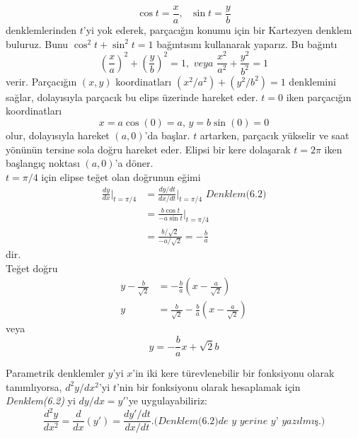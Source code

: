 \begin{cozum}
	\begin{equation*}
	\cos t= \frac{x}{a},\textit{ 		} \sin t= \frac{y}{b}
	\end{equation*}
denklemlerinden $t$'yi yok ederek, parçacığın konumu için bir Kartezyen denklem buluruz. Bunu $\cos^2t+\sin^2t =1$ bağıntısını kullanarak yaparız. Bu bağıntı
	\begin{equation*}
	\left( \dfrac{x}{a}\right) ^{2}+\left( \dfrac{y}{b}\right) ^{2}=1,\textit{ 	veya	} \frac{x^2}{a^2}+\frac{y^2}{b^2}=1
	\end{equation*}
verir. Parçacığın $(x,y)$ koordinatları $(x^2/a^2)+(y^2/b^2)=1$ denklemini sağlar, dolayısıyla parçacık bu elips üzerinde hareket eder. $t=0$ iken parçacığın koordinatları
	\begin{equation*}
	x=a \cos (0) =a  \textit{, 	} y= b \sin (0) = 0
	\end{equation*}
olur, dolayısıyla hareket $(a,0)$'da başlar. $t$ artarken, parçacık yükselir ve saat yönünün tersine sola doğru hareket eder. Elipsi bir kere dolaşarak $t=2\pi$ iken başlangıç noktası $(a,0)$'a döner.\\
	$t= \pi /4$ için elipse teğet olan doğrunun eğimi
	\begin{equation*}
	\begin{split}
	\frac{dy}{dx}|_{t=\pi/4} &=\frac{dy/dt}{dx/dt}|_{t=\pi/4} 	\textit{ 		 Denklem(6.2)}\\
	&=\frac{b \cos t}{-a \sin t}|_{t=\pi/4}\\
	&=\frac{b/\sqrt{2}}{-a/\sqrt{2}}=-\frac{b}{a}
		\end{split}
	\end{equation*}
dir.\\
Teğet doğru
	\begin{equation*}
	\begin{split}
	y-\frac{b}{\sqrt{2}}&=-\frac{b}{a}\left( x-\frac{a}{\sqrt{2}}\right)\\
	y&=\frac{b}{\sqrt{2}}-\frac{b}{a}\left(x-\frac{a}{\sqrt{2}}\right)
	\end{split}
	\end{equation*}
veya	
	\begin{equation*}
	y= -\frac{b}{a}x+ \sqrt{2}b
	\end{equation*}
\end{cozum}
	Parametrik denklemler $y$'yi $x$'in iki kere türevlenebilir bir fonksiyonu olarak tanımlıyorsa, $d^2y/dx^2$'yi $t$'nin bir fonksiyonu olarak hesaplamak için  \textit{Denklem(6.2)} yi $dy/dx=y'$'ye uygulayabiliriz:
	\begin{equation*}
	\frac{d^2y}{dx^2}=\frac{d}{dx}(y') = \frac{dy'/dt}{dx/dt}.\textit{(Denklem(6.2)de y yerine y' yazılmış.)}
	\end{equation*}\\

